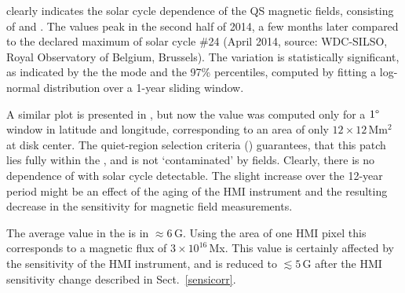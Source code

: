 \documentclass{aa}
\begin{document}
 clearly indicates the solar cycle dependence of the 
QS
magnetic fields, consisting of \NW{} and \IN{}. The \brms{} values peak in the second half of 2014, %
a few months later compared to the
declared maximum of solar cycle \#24 (April 2014, source: WDC-SILSO, Royal Observatory of Belgium, Brussels). The variation is statistically significant, as indicated by the the mode and the 97\% percentiles, computed by fitting a log-normal distribution over a 1-year sliding window.

A similar plot is presented in , but now the \brms{} value was computed only for a $1\degree$ window in latitude and longitude, corresponding to an area of only $12\times 12$\,Mm$^2$ at disk center. The quiet-region selection criteria () guarantees, that this patch lies fully within the \IN{}, and is not `contaminated' by \NW{} fields. Clearly, there is no dependence of \brms{} with solar cycle detectable. The 
slight increase over the 12-year period might be an effect of the aging of the HMI instrument and the resulting decrease in the sensitivity for magnetic field measurements.

The average \brms{} value in the \IN{} is in $\approx6$\,G. Using the area of one HMI pixel this corresponds to a magnetic flux of $3\times 10^{16}$\,Mx. 
This value is certainly affected by the sensitivity of the HMI instrument, and is reduced to $\lesssim5$\,G after the HMI sensitivity change described in Sect.~\ref{sensicorr}.



\end{document}
